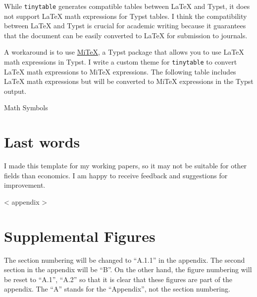 \documentclass[
  12pt,
  letterpaper,
]{article}
\begin{document}
While \texttt{tinytable} generates compatible tables between LaTeX and
Typst, it does not support LaTeX math expressions for Typst tables. I
think the compatibility between LaTeX and Typst is crucial for academic
writing because it guarantees that the document can be easily converted
to LaTeX for submission to journals.

A workaround is to use
\href{https://typst.app/universe/package/mitex/}{MiTeX}, a Typst package
that allows you to use LaTeX math expressions in Typst. I write a custom
theme for \texttt{tinytable} to convert LaTeX math expressions to MiTeX
expressions. The following table includes LaTeX math expressions but
will be converted to MiTeX expressions in the Typst output.

\begin{table}

\caption{\label{tbl-math}Math Symbols}


\end{table}%

\section{Last words}\label{last-words}

I made this template for my working papers, so it may not be suitable
for other fields than economics. I am happy to receive feedback and
suggestions for improvement.

{{< appendix  >}}

\section{Supplemental Figures}\label{supplemental-figures}

The section numbering will be changed to ``A.1.1'' in the appendix. The
second section in the appendix will be ``B''. On the other hand, the
figure numbering will be reset to ``A.1'', ``A.2'' so that it is clear
that these figures are part of the appendix. The ``A'' stands for the
``Appendix'', not the section numbering.
\end{document}
